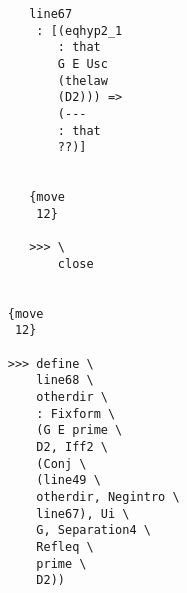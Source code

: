 \documentclass[12pt]{article}
\begin{document}
\begin{verbatim}
                                       line67 
                                        : [(eqhyp2_1 
                                           : that 
                                           G E Usc 
                                           (thelaw 
                                           (D2))) => 
                                           (--- 
                                           : that 
                                           ??)]


                                       {move 
                                        12}

                                       >>> \
                                           close


                                    {move 
                                     12}

                                    >>> define \
                                        line68 \
                                        otherdir \
                                        : Fixform \
                                        (G E prime \
                                        D2, Iff2 \
                                        (Conj \
                                        (line49 \
                                        otherdir, Negintro \
                                        line67), Ui \
                                        G, Separation4 \
                                        Refleq \
                                        prime \
                                        D2))



\end{verbatim}
\end{document}
